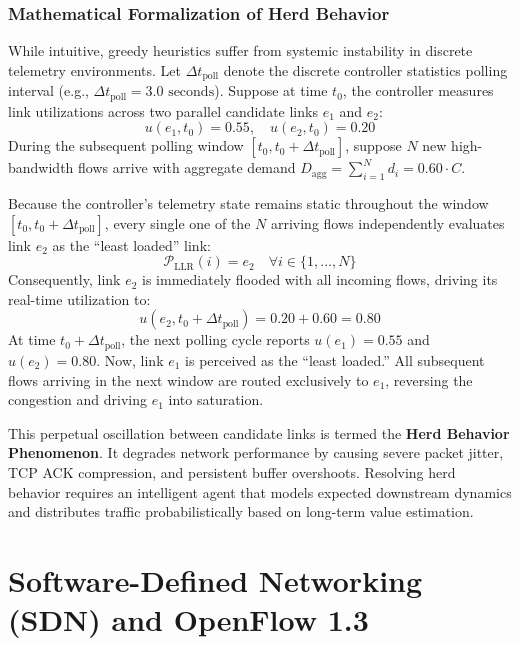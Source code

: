 \documentclass[12pt,a4paper,oneside]{report}
\begin{document}
\subsubsection{Mathematical Formalization of Herd Behavior}
While intuitive, greedy heuristics suffer from systemic instability in discrete telemetry environments. Let $\Delta t_{\text{poll}}$ denote the discrete controller statistics polling interval (e.g., $\Delta t_{\text{poll}} = 3.0\text{ seconds}$). Suppose at time $t_0$, the controller measures link utilizations across two parallel candidate links $e_1$ and $e_2$:
\begin{equation}
    u(e_1, t_0) = 0.55, \quad u(e_2, t_0) = 0.20
\end{equation}
During the subsequent polling window $[t_0, t_0 + \Delta t_{\text{poll}}]$, suppose $N$ new high-bandwidth flows arrive with aggregate demand $D_{\text{agg}} = \sum_{i=1}^N d_i = 0.60 \cdot C$.

Because the controller's telemetry state remains static throughout the window $[t_0, t_0 + \Delta t_{\text{poll}}]$, every single one of the $N$ arriving flows independently evaluates link $e_2$ as the ``least loaded'' link:
\begin{equation}
    \mathcal{P}_{\text{LLR}}(i) = e_2 \quad \forall i \in \{1, \dots, N\}
\end{equation}
Consequently, link $e_2$ is immediately flooded with all incoming flows, driving its real-time utilization to:
\begin{equation}
    u(e_2, t_0 + \Delta t_{\text{poll}}) = 0.20 + 0.60 = 0.80
\end{equation}
At time $t_0 + \Delta t_{\text{poll}}$, the next polling cycle reports $u(e_1) = 0.55$ and $u(e_2) = 0.80$. Now, link $e_1$ is perceived as the ``least loaded.'' All subsequent flows arriving in the next window are routed exclusively to $e_1$, reversing the congestion and driving $e_1$ into saturation.

This perpetual oscillation between candidate links is termed the \textbf{Herd Behavior Phenomenon}. It degrades network performance by causing severe packet jitter, TCP ACK compression, and persistent buffer overshoots. Resolving herd behavior requires an intelligent agent that models expected downstream dynamics and distributes traffic probabilistically based on long-term value estimation.

\section{Software-Defined Networking (SDN) and OpenFlow 1.3}
\end{document}
